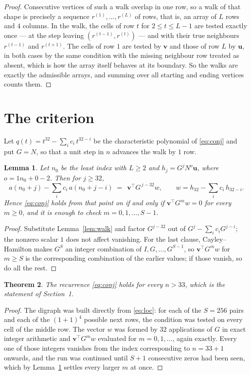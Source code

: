 \documentclass[11pt,a4paper]{article}
\theoremstyle{plain}
\newtheorem{theorem}{Theorem}
\newtheorem{lemma}[theorem]{Lemma}
\theoremstyle{definition}
\begin{document}
\begin{proof}
Consecutive vertices of such a walk overlap in one row, so a walk of that shape is
precisely a sequence $r^{(1)},\dots,r^{(L)}$ of rows, that is, an array of $L$ rows
and $4$ columns. In the walk, the cells of row $t$ for $2\le t\le L-1$ are tested
exactly once --- at the step leaving $(r^{(t-1)},r^{(t)})$ --- and with their true
neighbours $r^{(t-1)}$ and $r^{(t+1)}$. The cells of row $1$ are tested by
$\mathbf{v}$ and those of row $L$ by $\mathbf{u}$, in both cases by the same condition
with the missing neighbour row treated as absent, which is how the array itself behaves at
its boundary. So the walks are exactly the admissible arrays, and summing over all starting
and ending vertices counts them.
\end{proof}

\section{The criterion}

Let $q(t)=t^{32}-\sum_i c_i\,t^{32-i}$ be the characteristic polynomial of
\eqref{eq:conj} and put $G=N$, so that a unit step in $n$ advances the walk by
$1$ row.

\begin{lemma}\label{lem:crit}
Let $n_0$ be the least index with $L\ge2$ and $h_j=G^{j}N^{o}\mathbf{u}$, where
$o=1n_0+0-2$. Then for $j\ge32$,
\[
a(n_0+j)-\sum_i c_i\,a(n_0+j-i)\;=\;\,\mathbf{v}^{\!\top}G^{\,j-32}w,
\qquad w=h_{32}-\sum_i c_i\,h_{32-i} .
\]
Hence \eqref{eq:conj} holds from that point on if and only if
$\mathbf{v}^{\!\top}G^{m}w=0$ for every $m\ge0$, and it is enough to check
$m=0,1,\dots,S-1$.
\end{lemma}

\begin{proof}
Substitute Lemma~\ref{lem:walk} and factor $G^{j-32}$ out of
$G^{j}-\sum_ic_iG^{j-i}$; the nonzero scalar $1$ does not affect
vanishing. For the last clause, Cayley--Hamilton makes $G^{S}$ an integer combination of
$I,G,\dots,G^{S-1}$, so $\mathbf{v}^{\!\top}G^{m}w$ for $m\ge S$ is the corresponding
combination of the earlier values; if those vanish, so do all the rest.
\end{proof}

\begin{theorem}
The recurrence \eqref{eq:conj} holds for every $n>33$, which is the statement of
Section~1.
\end{theorem}

\begin{proof}
The digraph was built directly from \eqref{eq:loc}: for each of the $S=256$ pairs and each
of the $(1+1)^{4}$ possible next rows, the condition was tested on every cell of
the middle row. The vector $w$ was formed by $32$ applications of $G$ in exact integer
arithmetic and $\mathbf{v}^{\!\top}G^{m}w$ evaluated for $m=0,1,\dots$, again exactly.
Every one of those integers vanishes from the index corresponding to $n=33+1$ onwards,
and the run was continued until $S+1$ consecutive zeros had been seen, which by
Lemma~\ref{lem:crit} settles every larger $m$ at once.
\end{proof}
\end{document}
